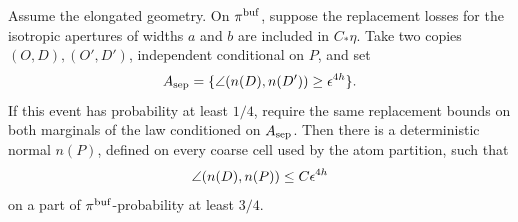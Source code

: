 \begin{lemma}
\label{lem:orientation-prediction}
Assume the elongated geometry.  On \(\pi^{\rm buf}\), suppose the
replacement losses for the isotropic apertures of widths \(a\) and
\(b\) are included in \(C_*\eta\).  Take two copies
\((O,D),(O',D')\), independent conditional on \(P\), and set
\[
 A_{\rm sep}=\{\angle(n(D),n(D'))\ge\epsilon^{4h}\}.
\]
If this event has probability at least \(1/4\), require the same
replacement bounds on both marginals of the law conditioned on
\(A_{\rm sep}\).  Then there is a
deterministic normal \(n(P)\), defined on every coarse cell used
by the atom partition, such that
\[
 \angle(n(D),n(P))\le C\epsilon^{4h}
\]
on a part of \(\pi^{\rm buf}\)-probability at least \(3/4\).
\end{lemma}

